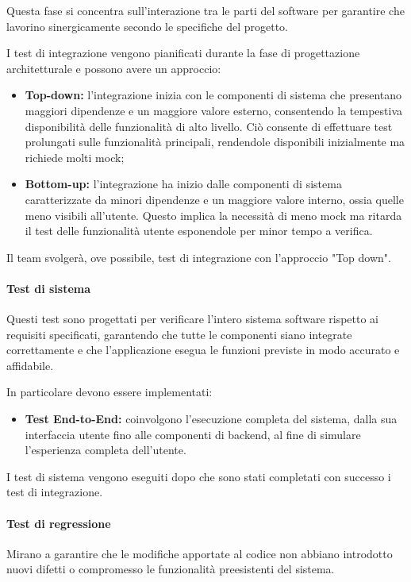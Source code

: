 Questa fase si concentra sull'interazione tra le parti del software per garantire che lavorino sinergicamente secondo le specifiche del progetto.

I test di integrazione vengono pianificati durante la fase di progettazione architetturale e possono avere un approccio:

\begin{itemize}
    \item \textbf{Top-down:}
        l'integrazione inizia con le componenti di sistema che presentano maggiori dipendenze e un maggiore valore esterno, consentendo la tempestiva disponibilità delle funzionalità di alto livello. Ciò consente di effettuare test prolungati sulle funzionalità principali, rendendole disponibili inizialmente ma richiede molti mock;
    \item \textbf{Bottom-up:}
        l'integrazione ha inizio dalle componenti di sistema caratterizzate da minori dipendenze e un maggiore valore interno, ossia quelle meno visibili all'utente. Questo implica la necessità di meno mock ma ritarda il test delle funzionalità utente esponendole per minor tempo a verifica.
\end{itemize}

Il team svolgerà, ove possibile, test di integrazione con l'approccio "Top down".

\paragraph{Test di sistema}
Questi test sono progettati per verificare l'intero sistema software rispetto ai requisiti specificati, garantendo che tutte le componenti siano integrate correttamente e che l'applicazione esegua le funzioni previste in modo accurato e affidabile.

In particolare devono essere implementati:
\begin{itemize}
    \item  \textbf{Test End-to-End:} 
        coinvolgono l'esecuzione completa del sistema, dalla sua interfaccia utente fino alle componenti di backend, al fine di simulare l'esperienza completa dell'utente.
\end{itemize}

I test di sistema vengono eseguiti dopo che sono stati completati con successo i test di integrazione.

\paragraph{Test di regressione}
Mirano a garantire che le modifiche apportate al codice non abbiano introdotto nuovi difetti o compromesso le funzionalità preesistenti del sistema.


